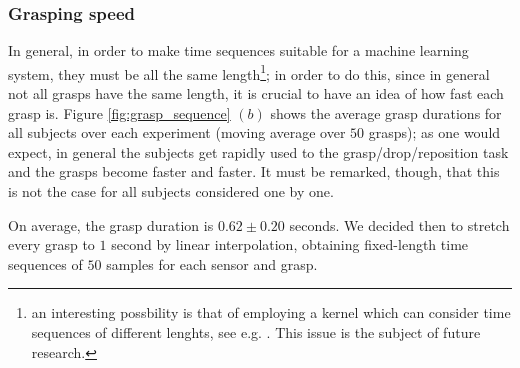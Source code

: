 \subsubsection*{Grasping speed}

In general, in order to make time sequences suitable for a machine
learning system, they must be all the same length\footnote{an
interesting possbility is that of employing a kernel which can
consider time sequences of different lenghts, see
e.g. \cite{shimodaira02dynamic}. This issue is the subject of future
research.}; in order to do this, since in general not all grasps have
the same length, it is crucial to have an idea of how fast each grasp
is. Figure \ref{fig:grasp_sequence} $(b)$ shows the average grasp
durations for all subjects over each experiment (moving average over
$50$ grasps); as one would expect, in general the subjects get rapidly
used to the grasp/drop/reposition task and the grasps become faster
and faster. It must be remarked, though, that this is not the case for
all subjects considered one by one.

On average, the grasp duration is $0.62 \pm 0.20$ seconds. We decided
then to stretch every grasp to $1$ second by linear interpolation,
obtaining fixed-length time sequences of $50$ samples for each sensor
and grasp.
